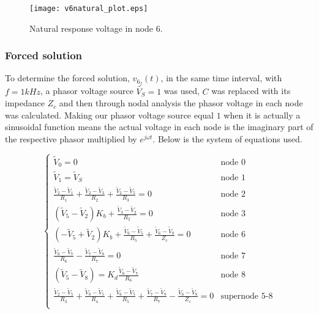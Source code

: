 

\begin{figure}[H] \centering
\texttt{[image: v6natural\_plot.eps]}
\caption{Natural response voltage in node 6.}
\label{fig:natural}
\end{figure}


\subsubsection{Forced solution}  %
\label{subsubsec:theor_forced}
To determine the forced solution, $v_{6_{f}}(t)$, in the same time interval, with $f=1kHz$, a phasor voltage source $\tilde{V_S}=1$ was used, $C$ was replaced with its impedance $Z_c$ and then through nodal analysis the phasor voltage in each node was calculated. Making our phasor voltage source equal $1$ when it is actually a sinusoidal function means the actual voltage in each node is the imaginary part of the respective phasor multiplied by $e^{j \omega t}$. Below is the system of equations used.


\begin{equation}
  \begin{cases}
  \tilde{V}_0 = 0 & \mbox{node 0} \\
   \tilde{V}_1 = \tilde{V}_S & \mbox{node 1} \\
  \frac{\tilde{V}_2-\tilde{V}_1}{R_1}+\frac{\tilde{V}_2-\tilde{V}_3}{R_2}+\frac{\tilde{V}_2-\tilde{V}_5}{R_3} = 0 & \mbox{node 2} \\
  (\tilde{V}_5-\tilde{V}_2)K_b + \frac{\tilde{V}_3-\tilde{V}_2}{R_2} = 0 & \mbox{node 3} \\
  (-\tilde{V}_5+\tilde{V}_2)K_b + \frac{\tilde{V}_6-\tilde{V}_5}{R_5} + \frac{\tilde{V}_6-\tilde{V}_8}{Z_c} = 0 & \mbox{node 6} \\
  \frac{\tilde{V}_0-\tilde{V}_7}{R_6} - \frac{\tilde{V}_7-\tilde{V}_8}{R_7} = 0 & \mbox{node 7} \\
  (\tilde{V}_5-\tilde{V}_8) = K_d \frac{\tilde{V}_0-\tilde{V}_7}{R_6} & \mbox{node 8} \\
  \frac{\tilde{V}_2-\tilde{V}_5}{R_3} + \frac{\tilde{V}_0-\tilde{V}_5}{R_4} + \frac{\tilde{V}_6-\tilde{V}_5}{R_5} + \frac{\tilde{V}_7-\tilde{V}_8}{R_7} - \frac{\tilde{V}_6-\tilde{V}_8}{Z_c} = 0 & \mbox{supernode 5-8} \\ 
  \end{cases}
\end{equation}

